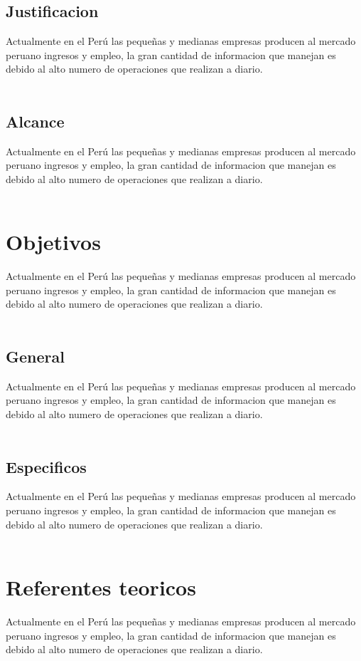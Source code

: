 \documentclass[twoside,twocolumn]{article}
\begin{document}
\subsection{Justificacion}
Actualmente en el Perú las pequeñas y medianas empresas producen al mercado peruano ingresos y empleo, la gran cantidad de informacion que manejan es debido al alto numero de operaciones que realizan a diario.\\ \\

\subsection{Alcance}
Actualmente en el Perú las pequeñas y medianas empresas producen al mercado peruano ingresos y empleo, la gran cantidad de informacion que manejan es debido al alto numero de operaciones que realizan a diario.\\ \\

\section{Objetivos}
Actualmente en el Perú las pequeñas y medianas empresas producen al mercado peruano ingresos y empleo, la gran cantidad de informacion que manejan es debido al alto numero de operaciones que realizan a diario.\\ \\

\subsection{General}
Actualmente en el Perú las pequeñas y medianas empresas producen al mercado peruano ingresos y empleo, la gran cantidad de informacion que manejan es debido al alto numero de operaciones que realizan a diario.\\ \\

\subsection{Especificos}
Actualmente en el Perú las pequeñas y medianas empresas producen al mercado peruano ingresos y empleo, la gran cantidad de informacion que manejan es debido al alto numero de operaciones que realizan a diario.\\ \\

\section{Referentes teoricos}
Actualmente en el Perú las pequeñas y medianas empresas producen al mercado peruano ingresos y empleo, la gran cantidad de informacion que manejan es debido al alto numero de operaciones que realizan a diario.\\ \\
\end{document}
